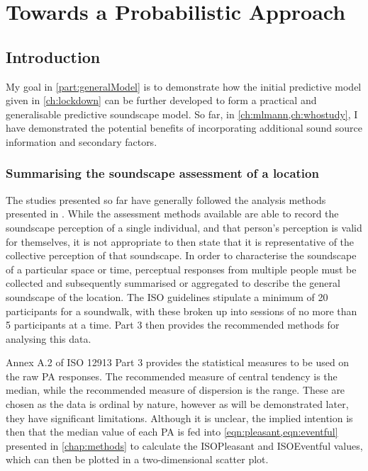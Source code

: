 \chapter{Towards a Probabilistic Approach}
\label{ch:ProbabilisticPOC}

\section{Introduction}

My goal in \cref{part:generalModel} is to demonstrate how the initial predictive model given in \cref{ch:lockdown} can be further developed to form a practical and generalisable predictive soundscape model. So far, in \cref{ch:mlmann,ch:whostudy}, I have demonstrated the potential benefits of incorporating additional sound source information and secondary factors. 

\subsection{Summarising the soundscape assessment of a location}
The studies presented so far have generally followed the analysis methods presented in \citet{ISO12913Part3}. While the assessment methods available are able to record the soundscape perception of a single individual, and that person's perception is valid for themselves, it is not appropriate to then state that it is representative of the collective perception of that soundscape. In order to characterise the soundscape of a particular space or time, perceptual responses from multiple people must be collected and subsequently summarised or aggregated to describe the general soundscape of the location. The ISO guidelines stipulate a minimum of 20 participants for a soundwalk, with these broken up into sessions of no more than 5 participants at a time. Part 3 then provides the recommended methods for analysing this data.

Annex A.2 of ISO 12913 Part 3 provides the statistical measures to be used on the raw PA responses. The recommended measure of central tendency is the median, while the recommended measure of dispersion is the range. These are chosen as the data is ordinal by nature, however as will be demonstrated later, they have significant limitations. Although it is unclear, the implied intention is then that the median value of each PA is fed into \cref{eqn:pleasant,eqn:eventful} presented in \cref{chap:methods} to calculate the ISOPleasant and ISOEventful values, which can then be plotted in a two-dimensional scatter plot.

